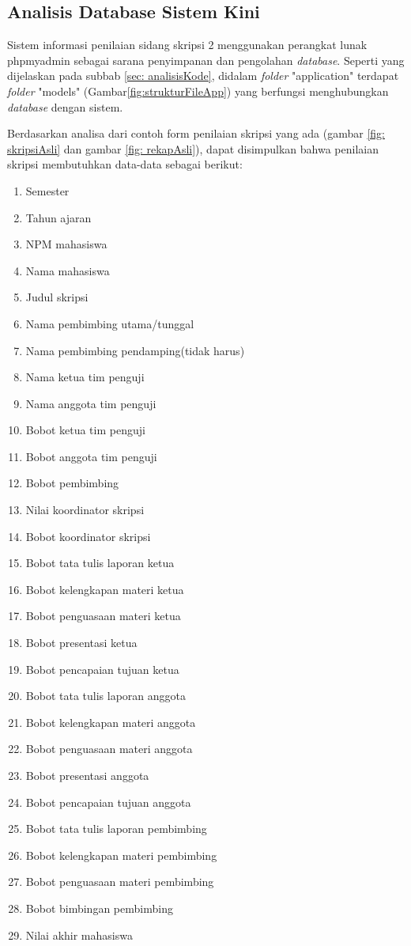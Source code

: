 		
	\subsection{Analisis Database Sistem Kini}
	\label{sub: analisisDatabase}
	
	Sistem informasi penilaian sidang skripsi 2 menggunakan perangkat lunak phpmyadmin sebagai sarana penyimpanan dan pengolahan \textit{database}. Seperti yang dijelaskan pada subbab \ref{sec: analisisKode}, didalam \textit{folder} "application" terdapat \textit{folder} "models" (Gambar\ref{fig:strukturFileApp}) yang berfungsi menghubungkan \textit{database} dengan sistem. 
	
	Berdasarkan analisa dari contoh form penilaian skripsi yang ada (gambar \ref{fig: skripsiAsli} dan gambar \ref{fig: rekapAsli}), dapat disimpulkan bahwa penilaian skripsi membutuhkan data-data sebagai berikut:
		
		\begin{enumerate}
			\item Semester
			\item Tahun ajaran
			\item NPM mahasiswa 
			\item Nama mahasiswa
			\item Judul skripsi
			\item Nama pembimbing utama/tunggal
			\item Nama pembimbing pendamping(tidak harus)
			\item Nama ketua tim penguji
			\item Nama anggota tim penguji
			\item Bobot ketua tim penguji
			\item Bobot anggota tim penguji
			\item Bobot pembimbing
			\item Nilai koordinator skripsi
			\item Bobot koordinator skripsi
			\item Bobot tata tulis laporan ketua
			\item Bobot kelengkapan materi ketua
			\item Bobot penguasaan materi ketua
			\item Bobot presentasi ketua
			\item Bobot pencapaian tujuan ketua
			\item Bobot tata tulis laporan anggota
			\item Bobot kelengkapan materi anggota
			\item Bobot penguasaan materi anggota
			\item Bobot presentasi anggota
			\item Bobot pencapaian tujuan anggota
			\item Bobot tata tulis laporan pembimbing
			\item Bobot kelengkapan materi pembimbing
			\item Bobot penguasaan materi pembimbing
			\item Bobot bimbingan pembimbing
			\item Nilai akhir mahasiswa
		\end{enumerate}
	
